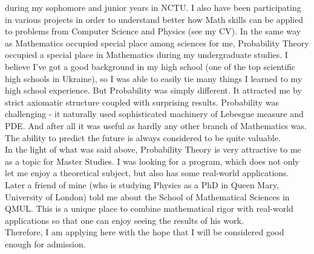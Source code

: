 \documentclass[10pt]{article}
\begin{document}
during my sophomore and junior years in NCTU. I also have been participating in various projects in order to understand better how Math skills
can be applied to problems from Computer Science and Physics (see my CV).
In the same way as Mathematics occupied special place among sciences for me, Probability Theory occupied a special place in Mathematics during
my undergraduate studies. I believe I've got a good background in my high school (one of the top scientific high schools in Ukraine), so I was
able to easily tie many things I learned to my high school experience. But Probability was simply different. It attracted me by strict axiomatic
structure coupled with surprising results. Probability was challenging - 
it naturally used sophisticated machinery of Lebesgue measure and PDE. And
after all it was useful as hardly any other branch of Mathematics was. The ability to predict the future is always considered to be quite valuable.\\
In the light of what was said above, Probability Theory is very attractive to me as a topic for Master Studies. I was looking for a program,
which does not only let me enjoy a theoretical subject, but also has some real-world applications. Later a friend
of mine (who is studying Physics as a PhD in Queen Mary, University of London) told me about the School of Mathematical Sciences in QMUL. This is
a unique place to combine mathematical rigor with real-world applications so that one can enjoy seeing the results of his work.\\
Therefore, I am applying here with the hope that I will be considered good enough for admission.
\end{document}
